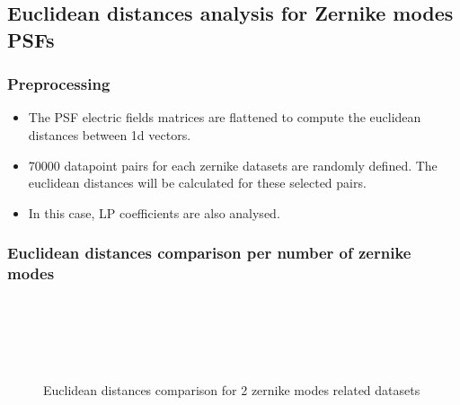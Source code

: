 \FloatBarrier
\subsection{Euclidean distances analysis for Zernike modes PSFs}

	\subsubsection{Preprocessing}
		
		\begin{itemize}
			\item The PSF electric fields matrices are flattened to compute the euclidean distances between 1d vectors.
			\item 70000 datapoint pairs for each zernike datasets are randomly defined. The euclidean distances will be calculated for these selected pairs.
			\item In this case, LP coefficients are also analysed.
		\end{itemize}
			
	\subsubsection{Euclidean distances comparison per number of zernike modes}
	
		\begin{figure*}[ht!]
			\centering
			\\
			\\
			\\
			\\
				
			\caption{Euclidean distances comparison for 2 zernike modes related datasets}
		\end{figure*}
		\FloatBarrier
		
